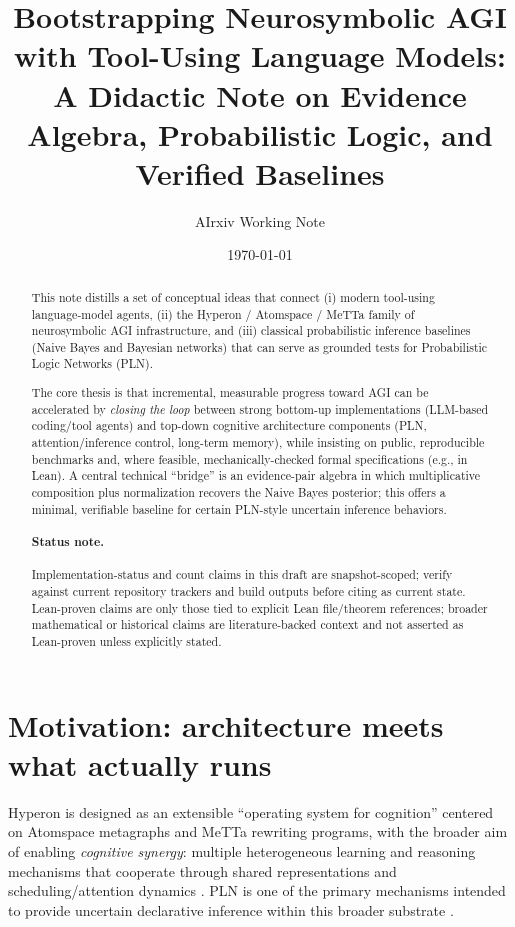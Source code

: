 \documentclass[11pt]{article}
\title{Bootstrapping Neurosymbolic AGI with Tool-Using Language Models:\\
A Didactic Note on Evidence Algebra, Probabilistic Logic, and Verified Baselines}
\author{AIrxiv Working Note}
\date{\today}
\begin{document}
\maketitle

\begin{abstract}
This note distills a set of conceptual ideas that connect (i) modern tool-using language-model agents,
(ii) the Hyperon / Atomspace / MeTTa family of neurosymbolic AGI infrastructure, and (iii) classical
probabilistic inference baselines (Naive Bayes and Bayesian networks) that can serve as grounded tests
for Probabilistic Logic Networks (PLN).

The core thesis is that incremental, measurable progress toward AGI can be accelerated by
\emph{closing the loop} between strong bottom-up implementations (LLM-based coding/tool agents)
and top-down cognitive architecture components (PLN, attention/inference control, long-term memory),
while insisting on public, reproducible benchmarks and, where feasible, mechanically-checked
formal specifications (e.g., in Lean). A central technical ``bridge'' is an evidence-pair algebra in which
multiplicative composition plus normalization recovers the Naive Bayes posterior; this offers a minimal,
verifiable baseline for certain PLN-style uncertain inference behaviors.
\paragraph{Status note.} Implementation-status and count claims in this draft are snapshot-scoped; verify against current repository trackers and build outputs before citing as current state. Lean-proven claims are only those tied to explicit Lean file/theorem references; broader mathematical or historical claims are literature-backed context and not asserted as Lean-proven unless explicitly stated.
\end{abstract}

\section{Motivation: architecture meets what actually runs}

Hyperon is designed as an extensible ``operating system for cognition'' centered on Atomspace
metagraphs and MeTTa rewriting programs, with the broader aim of enabling \emph{cognitive synergy}:
multiple heterogeneous learning and reasoning mechanisms that cooperate through shared
representations and scheduling/attention dynamics \cite{hyperon-overview,hyperon-plan}.
PLN is one of the primary mechanisms intended to provide uncertain declarative inference within
this broader substrate \cite{pln-book,hyperon-overview}.
\end{document}
